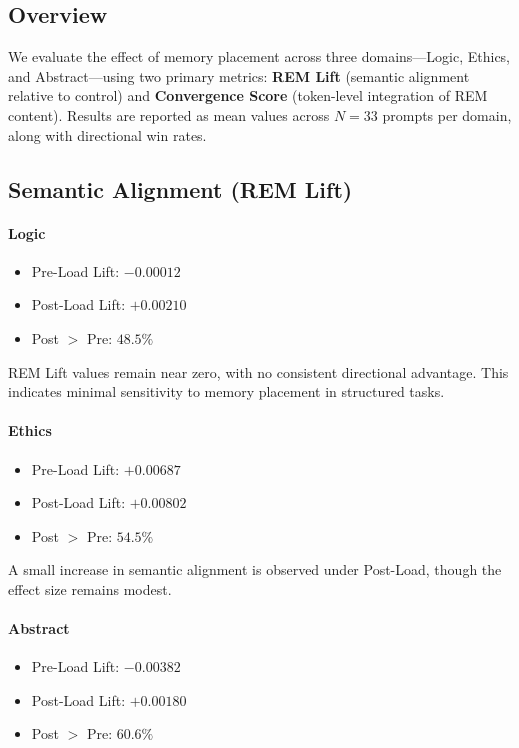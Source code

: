 \documentclass[11pt]{article}
\begin{document}
\subsection{Overview}

We evaluate the effect of memory placement across three domains—Logic, Ethics, and Abstract—using two primary metrics: \textbf{REM Lift} (semantic alignment relative to control) and \textbf{Convergence Score} (token-level integration of REM content). Results are reported as mean values across $N=33$ prompts per domain, along with directional win rates.

\subsection{Semantic Alignment (REM Lift)}

\paragraph{Logic}

\begin{itemize}
\item Pre-Load Lift: $-0.00012$
\item Post-Load Lift: $+0.00210$
\item Post $>$ Pre: $48.5\%$
\end{itemize}

REM Lift values remain near zero, with no consistent directional advantage. This indicates minimal sensitivity to memory placement in structured tasks.

\paragraph{Ethics}

\begin{itemize}
\item Pre-Load Lift: $+0.00687$
\item Post-Load Lift: $+0.00802$
\item Post $>$ Pre: $54.5\%$
\end{itemize}

A small increase in semantic alignment is observed under Post-Load, though the effect size remains modest.

\paragraph{Abstract}

\begin{itemize}
\item Pre-Load Lift: $-0.00382$
\item Post-Load Lift: $+0.00180$
\item Post $>$ Pre: $60.6\%$
\end{itemize}
\end{document}
